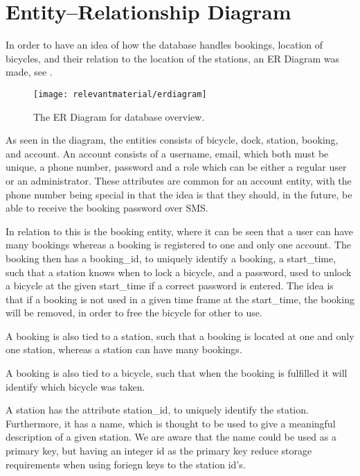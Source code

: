 \section{Entity--Relationship Diagram}\label{sec:ERdiagram}
In order to have an idea of how the database handles bookings, location of bicycles, and their relation to the location of the stations, an ER Diagram was made, see .

\begin{figure}
	\centering
	\texttt{[image: relevantmaterial/erdiagram]}
	\caption{The ER Diagram for database overview.}\label{fig:er-dia}
\end{figure}

As seen in the diagram, the entities consists of bicycle, dock, station, booking, and account.
An account consists of a username, email, which both must be unique, a phone number, password and a role which can be either a regular user or an administrator.
These attributes are common for an account entity, with the phone number being special in that the idea is that they should, in the future, be able to receive the booking password over SMS.

In relation to this is the booking entity, where it can be seen that a user can have many bookings whereas a booking is registered to one and only one account.
The booking then has a booking_id, to uniquely identify a booking, a start_time, such that a station knows when to lock a bicycle, and a password, used to unlock a bicycle at the given start_time if a correct password is entered.
The idea is that if a booking is not used in a given time frame at the start_time, the booking will be removed, in order to free the bicycle for other to use.

A booking is also tied to a station, such that a booking is located at one and only one station, whereas a station can have many bookings.

A booking is also tied to a bicycle, such that when the booking is fulfilled it will identify which bicycle was taken.

A station has the attribute station_id, to uniquely identify the station.
Furthermore, it has a name, which is thought to be used to give a meaningful description of a given station.
We are aware that the name could be used as a primary key, but having an integer id as the primary key reduce storage requirements when using foriegn keys to the station id's.


